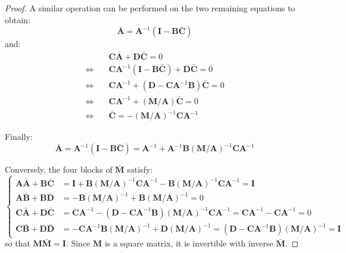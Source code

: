\begin{proof}
	A similar operation can be performed on the two remaining equations to obtain:
	\begin{equation}
		\bar{\mathbf{A}}=\mathbf{A}^{-1}(\mathbf{I}-\mathbf{B}\bar{\mathbf{C}})
	\end{equation}
	and:
	\begin{equation}
		\begin{aligned}
		&\mathbf{C}\bar{\mathbf{A}}+\mathbf{D}\bar{\mathbf{C}}=0\\
		\iff\quad&\mathbf{C}\mathbf{A}^{-1}(\mathbf{I}-\mathbf{B}\bar{\mathbf{C}})+\mathbf{D}\bar{\mathbf{C}}=0\\
		\iff\quad&\mathbf{C}\mathbf{A}^{-1}+(\mathbf{D}-\mathbf{C}\mathbf{A}^{-1}\mathbf{B})\bar{\mathbf{C}}=0\\
		\iff\quad&\mathbf{C}\mathbf{A}^{-1}+(\mathbf{M}/\mathbf{A})\bar{\mathbf{C}}=0\\
		\iff\quad&\bar{\mathbf{C}}=-(\mathbf{M}/\mathbf{A})^{-1}\mathbf{C}\mathbf{A}^{-1}
		\end{aligned}
	\end{equation}

	Finally:
	\begin{equation}
		\bar{\mathbf{A}}=\mathbf{A}^{-1}(\mathbf{I}-\mathbf{B}\bar{\mathbf{C}})=\mathbf{A}^{-1}+\mathbf{A}^{-1}\mathbf{B}(\mathbf{M}/\mathbf{A})^{-1}\mathbf{C}\mathbf{A}^{-1}
	\end{equation}

	Conversely, the four blocks of $\bar{\mathbf{M}}$ satisfy:
	\begin{equation}
		\left\{\begin{aligned}
		\mathbf{A}\bar{\mathbf{A}}+\mathbf{B}\bar{\mathbf{C}}&=\mathbf{I}+\mathbf{B}(\mathbf{M}/\mathbf{A})^{-1}\mathbf{C}\mathbf{A}^{-1}-\mathbf{B}(\mathbf{M}/\mathbf{A})^{-1}\mathbf{C}\mathbf{A}^{-1}=\mathbf{I}\\
		\mathbf{A}\bar{\mathbf{B}}+\mathbf{B}\bar{\mathbf{D}}&=-\mathbf{B}(\mathbf{M}/\mathbf{A})^{-1}+\mathbf{B}(\mathbf{M}/\mathbf{A})^{-1}=0\\
		\mathbf{C}\bar{\mathbf{A}}+\mathbf{D}\bar{\mathbf{C}}&=\mathbf{C}\mathbf{A}^{-1}-(\mathbf{D}-\mathbf{C}\mathbf{A}^{-1}\mathbf{B})(\mathbf{M}/\mathbf{A})^{-1}\mathbf{C}\mathbf{A}^{-1}=\mathbf{C}\mathbf{A}^{-1}-\mathbf{C}\mathbf{A}^{-1}=0\\
		\mathbf{C}\bar{\mathbf{B}}+\mathbf{D}\bar{\mathbf{D}}&=-\mathbf{C}\mathbf{A}^{-1}\mathbf{B}(\mathbf{M}/\mathbf{A})^{-1}+\mathbf{D}(\mathbf{M}/\mathbf{A})^{-1}=(\mathbf{D}-\mathbf{C}\mathbf{A}^{-1}\mathbf{B})(\mathbf{M}/\mathbf{A})^{-1}=\mathbf{I}
		\end{aligned}\right.
	\end{equation}
	so that $\mathbf{M}\bar{\mathbf{M}}=\mathbf{I}$. Since $\mathbf{M}$ is a square matrix, it is invertible with inverse $\bar{\mathbf{M}}$.
\end{proof}

